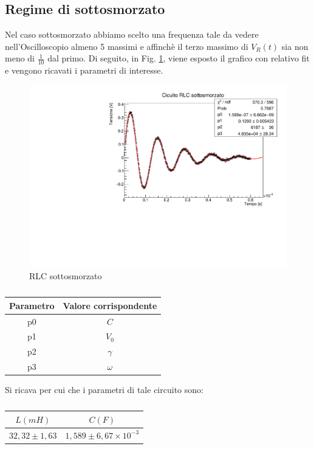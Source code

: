 \subsection{Regime di sottosmorzato}
Nel caso sottosmorzato abbiamo scelto una frequenza tale da vedere nell'Oscilloscopio almeno 5 massimi e affinchè il terzo massimo di $V_{R}(t)$ sia non meno di $\frac{1}{10}$ dal primo. Di seguito, in Fig. \ref{fig: sottosmorzato}, viene esposto il grafico con relativo fit e vengono ricavati i parametri di interesse.
\begin{figure}[H]
    \centering
    \includegraphics[scale=.4]{Immagini/Circuito_RLC_sottosmorzato.pdf}
    \caption{RLC sottosmorzato}
    \label{fig: sottosmorzato}
\end{figure}

\begin{table}[H]
    \centering
    \begin{tabular}{cc}
    \toprule
      Parametro   & Valore corrispondente \\
    \midrule
       p0  & $C$ \\
       p1  & $V_0$ \\
       p2  & $\gamma$ \\
       p3  & $\omega$ \\
    \bottomrule
    \end{tabular}
    \caption{}
\end{table}
Si ricava per cui che i parametri di tale circuito sono:
\begin{table}[h!]
    \centering
    \begin{tabular}{cc}
        \toprule
      $L (mH)$  & $C (F)$ \\
         \midrule
    $32,32\pm 1,63$     & $1,589\pm 6,67\times 10^{-3}$\\
    \bottomrule
    \end{tabular}
    \caption{}
\end{table}


